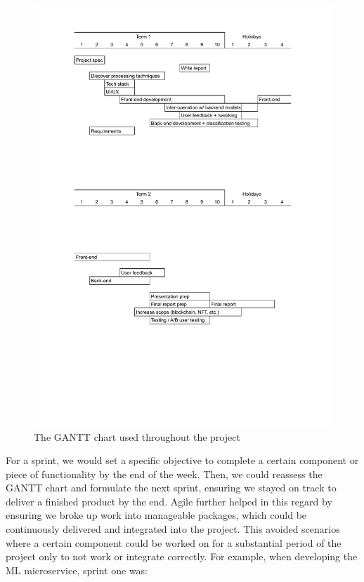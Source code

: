 \documentclass[12pt,a4paper]{article}
\begin{document}
\begin{figure}[H]
    \centering
    \includegraphics[scale=0.5]{gantt.pdf}
    \caption{The GANTT chart used throughout the project}
\end{figure}
For a sprint, we would set a specific objective to complete a certain component or piece of functionality by the end of the week. Then, we could reassess the GANTT chart and formulate the next sprint, ensuring we stayed on track to deliver a finished product by the end. Agile further helped in this regard by ensuring we broke up work into manageable packages, which could be continuously delivered and integrated into the project. This avoided scenarios where a certain component could be worked on for a substantial period of the project only to not work or integrate correctly. For example, when developing the ML microservice, sprint one was:
\\\\
\end{document}

